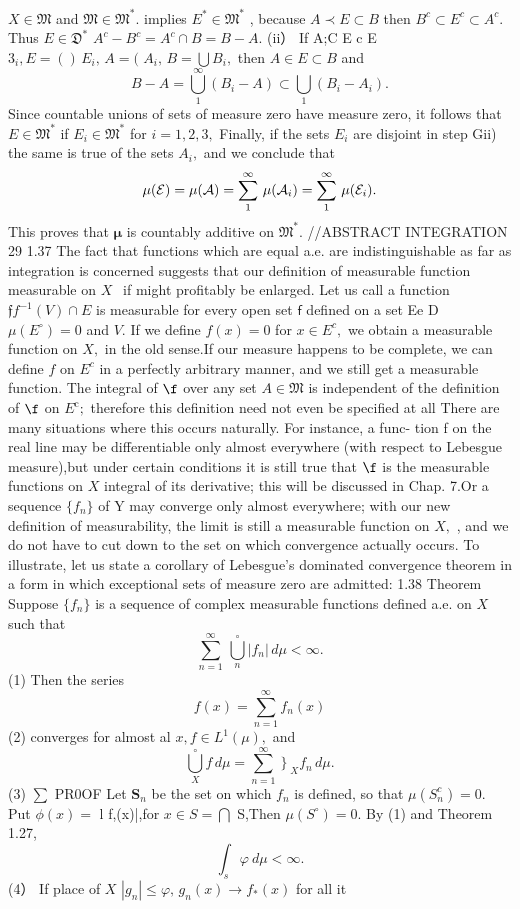 $\scriptstyle X\in{\mathfrak{M}}$ and ${\mathfrak{M}}\in{\mathfrak{M}}^{*}.$ implies $E^{*}\in{\mathfrak{M}}^{*}$ , because $A\prec E\subset B$ then $B^{c}\subset E^{c}\subset A^{c}.$ Thus $E\in{\mathfrak{D}}^{*}$ $A^{c}-B^{c}=A^{c}\cap B=B-A.$ (ii） If A;C E c E $3_{i},E=\left(\right)\,E_{i},\,A= (\frac{}{}\,A_{i},\,B=\bigcup B_{i},$ then $A\in E\subset B$ and $$ B-A=\bigcup_{1}^{\infty}(B_{i}-A)\subset\bigcup_{1}(B_{i}-A_{i}). $$ Since countable unions of sets of measure zero have measure zero, it follows that $E\in{\mathfrak{M}}^{*}$ if $E_{i}\in{\mathfrak{M}}^{*}$ for $i=1,2,3,$ Finally, if the sets $\textstyle E_{i}$ are disjoint in step Gii) the same is true of the sets $A_{i},$ and we conclude that $$ \mu({\cal E})=\mu({\cal A})=\sum_{1}^{\infty}\,\mu({\cal A}_{i})=\sum_{1}^{\infty}\,\mu({\cal E}_{i}). $$ This proves that ${\boldsymbol{\mu}}$ is countably additive on ${\mathfrak{M}}^{*}.$ //ABSTRACT INTEGRATION 29 1.37 The fact that functions which are equal a.e. are indistinguishable as far as integration is concerned suggests that our definition of measurable function measurable on $\textstyle X{\ ~}$ if might profitably be enlarged. Let us call a function ${\mathfrak{f}}f^{-1}(V)\cap E$ is measurable for every open set $\boldsymbol{\mathsf{f}}$ defined on a set Ee D $\mu(E^{\circ})=0$ and $V.$ If we define $f(x)=0$ for $x\in E^{c},$ we obtain a measurable function on $X,$ in the old sense.If our measure happens to be complete, we can define $\boldsymbol{\mathit{f}}$ on $E^{c}$ in a perfectly arbitrary manner, and we still get a measurable function. The integral of $\boldsymbol{\f}$ over any set $A\in{\mathfrak{M}}$ is independent of the definition of $\boldsymbol{\f}$ on $E^{\mathrm{c}};$ therefore this definition need not even be specified at all There are many situations where this occurs naturally. For instance, a func- tion f on the real line may be differentiable only almost everywhere (with respect to Lebesgue measure),but under certain conditions it is still true that $\boldsymbol{\f}$ is the measurable functions on $X$ integral of its derivative; this will be discussed in Chap. 7.Or a sequence $\{f_{n}\}$ of Y may converge only almost everywhere; with our new definition of measurability, the limit is still a measurable function on $X,$ , and we do not have to cut down to the set on which convergence actually occurs. To illustrate, let us state a corollary of Lebesgue's dominated convergence theorem in a form in which exceptional sets of measure zero are admitted: 1.38 Theorem Suppose $\{f_{n}\}$ is a sequence of complex measurable functions defined a.e. on $\textstyle X$ such that $$ \sum_{n=1}^{\infty}\,\bigcup_{\textstyle n}^{\circ}|f_{n}|\,d\mu<\infty. $$ (1) Then the series $$ f(x)=\sum_{n=1}^{\infty}f_{n}(x) $$ (2) converges for almost al $x,f\in L^{1}(\mu),$ and $$ \bigcup_{X}^{\circ}f\,d\mu=\sum_{n=1}^{\infty}\left.\right\}_{X}f_{n}\,d\mu. $$ (3) $\textstyle\sum$ PR0OF Let ${\boldsymbol{S}}_{n}$ be the set on which $\textstyle f_{n}$ is defined, so that $\mu(S_{n}^{c})=0.$ Put $\scriptstyle\phi(x)=$ l f,(x)|,for $x\in S=\bigcap$ S,Then $\mu(S^{\circ})=0.$ By (1) and Theorem 1.27, $$ \int_{s}\varphi~d\mu<\infty. $$ (4） If place of $X$ $|g_{n}|\leq\varphi,\,g_{n}(x)\to f_{*}(x)$ for all it 
